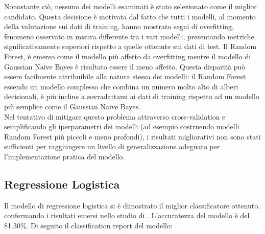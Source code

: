 \documentclass[../../Thesis.tex]{subfiles}
\begin{document}
Nonostante ciò, nessuno dei modelli esaminati è stato selezionato come il miglior candidato. Questa decisione è motivata dal fatto che tutti i modelli, al momento della valutazione sui dati di training, hanno mostrato segni di overfitting, fenomeno osservato in misura differente tra i vari modelli,  presentando metriche significativamente superiori rispetto a quelle ottenute sui dati di test. Il Random Forest, è emerso come il modello più affetto da overfitting mentre il modello di Gaussian Naive Bayes è risultato essere il meno affetto. Questa disparità può essere facilmente attribuibile alla natura stessa dei modelli: il Random Forest essendo un modello complesso che combina un numero molto alto di alberi decisionali, è più incline a sovradattarsi ai dati di training rispetto ad un modello più semplice come il Gaussian Naive Bayes.\\

Nel tentativo di mitigare questo problema attraverso cross-validation e semplificando gli iperparametri dei modelli (ad esempio costruendo modelli Random Forest più piccoli e meno profondi), i risultati migliorativi non sono stati sufficienti per raggiungere un livello di generalizzazione adeguato per l'implementazione pratica del modello.

\subsection{Regressione Logistica}
Il modello di regressione logistica si è dimostrato il miglior classificatore ottenuto, confermando i risultati emersi nello studio di \cite{Deng}. L'accuratezza del modello è del 81.30\%. Di seguito il classification report del modello:
\end{document}

